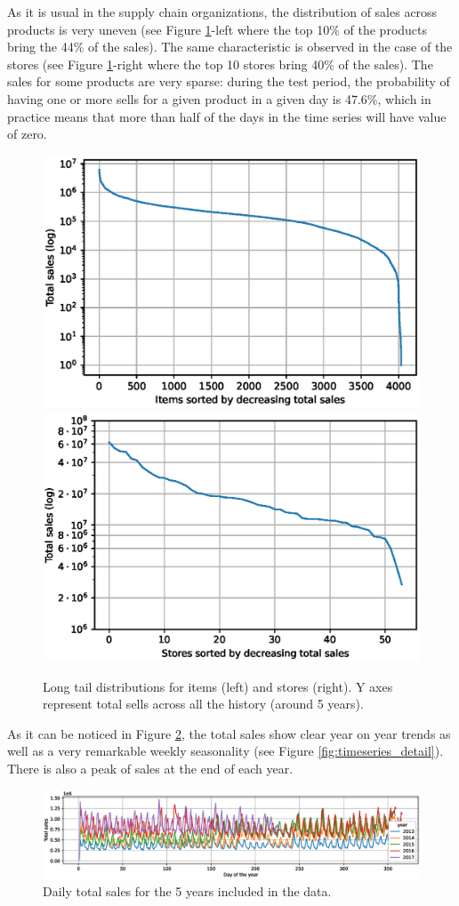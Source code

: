 As it is usual in the supply chain organizations, the distribution of sales across products is very uneven (see Figure \ref{fig:tails}-left where the top 10\% of the products bring the 44\% of the sales). The same characteristic is observed in the case of the stores (see Figure \ref{fig:tails}-right where the top 10 stores bring 40\% of the sales). The sales for some products are very sparse: during the test period, the probability of having one or more sells for a given product in a given day is 47.6\%, which in practice means that more than half of the days in the time series will have value of zero.

\begin{figure}
	\centering
	\includegraphics[width=0.48\linewidth]{salesforecast/images/items_tail_log}
	\includegraphics[width=0.48\linewidth]{salesforecast/images/stores_tail_log}
	\caption{Long tail distributions for items (left) and stores (right). Y axes represent total sells across all the history (around 5 years).}
	\label{fig:tails}
\end{figure}

As it can be noticed in Figure \ref{fig:timeseries}, the total sales show clear year on year trends as well as a very remarkable weekly seasonality (see Figure \ref{fig:timeseries_detail}). There is also a peak of sales at the end of each year.

 	\begin{figure}
 	\centering
 	\includegraphics[width=1\textwidth]{salesforecast/images/timeseries}
 	\caption{Daily total sales for the 5 years included in the data.}
 	\label{fig:timeseries}
\end{figure}


